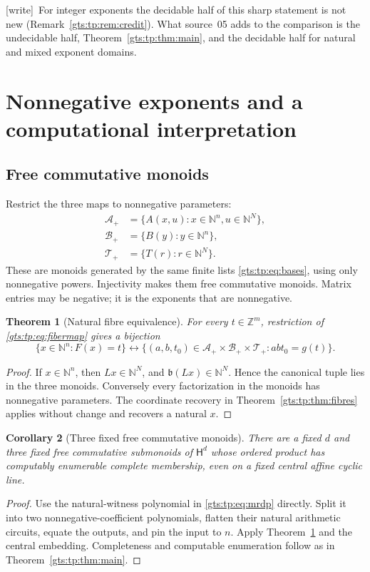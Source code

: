 \documentclass[11pt,letterpaper]{article}
\newtheorem{theorem}{Theorem}[section]
\newtheorem{corollary}[theorem]{Corollary}
\theoremstyle{definition}
\theoremstyle{remark}
\newcommand{\ZZ}{\mathbb Z}
\newcommand{\NN}{\mathbb N}
\newcommand{\HH}{\mathsf H}
\newcommand{\calA}{\mathcal A}
\newcommand{\calB}{\mathcal B}
\newcommand{\calT}{\mathcal T}
\newcommand{\bn}{\mathfrak b}
\newcommand{\wtag}{\textup{[write]}}
\begin{document}
\wtag\ For integer exponents the decidable half of this sharp statement is not new (Remark~\ref{gts:tp:rem:credit}). What source~05 adds to the comparison is the undecidable half, Theorem~\ref{gts:tp:thm:main}, and the decidable half for natural and mixed exponent domains.

\section{Nonnegative exponents and a computational interpretation}
\label{gts:tp:sec:monoids}

\subsection{Free commutative monoids}
Restrict the three maps to nonnegative parameters:
\begin{align*}
 \calA_+&=\{A(x,u):x\in\NN^n,u\in\NN^N\},\\
 \calB_+&=\{B(y):y\in\NN^n\},\\
 \calT_+&=\{T(r):r\in\NN^N\}.
\end{align*}
These are monoids generated by the same finite lists
\eqref{gts:tp:eq:bases}, using only nonnegative powers. Injectivity makes them free
commutative monoids. Matrix entries may be negative; it is the exponents
that are nonnegative.

\begin{theorem}[Natural fibre equivalence]\label{gts:tp:thm:natural}
For every $t\in\ZZ^m$, restriction of \eqref{gts:tp:eq:fibermap} gives a bijection
\[
 \{x\in\NN^n:F(x)=t\}
 \longleftrightarrow
 \{(a,b,t_0)\in\calA_+\times\calB_+\times\calT_+:ab t_0=g(t)\}.
\]
\end{theorem}
\begin{proof}
If $x\in\NN^n$, then $Lx\in\NN^N$, and $\bn(Lx)\in\NN^N$. Hence the
canonical tuple lies in the three monoids. Conversely every factorization
in the monoids has nonnegative parameters. The coordinate recovery in
Theorem~\ref{gts:tp:thm:fibres} applies without change and recovers a natural $x$.
\end{proof}

\begin{corollary}[Three fixed free commutative monoids]\label{gts:tp:cor:monoid}
There are a fixed $d$ and three fixed free commutative submonoids of $\HH^d$
whose ordered product has computably enumerable complete membership, even
on a fixed central affine cyclic line.
\end{corollary}
\begin{proof}
Use the natural-witness polynomial in \eqref{gts:tp:eq:mrdp} directly. Split it into
two nonnegative-coefficient polynomials, flatten their natural arithmetic
circuits, equate the outputs, and pin the input to $n$. Apply
Theorem~\ref{gts:tp:thm:natural} and the central embedding. Completeness and
computable enumeration follow as in Theorem~\ref{gts:tp:thm:main}.
\end{proof}
\end{document}
